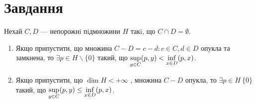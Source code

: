
\chapter{Завдання \theHchapter}


\begin{tcolorbox}[title=Завдання]
    Нехай $C, D$ — непорожнi пiдмножини $H$ такi, що 
    $C \cap D = \emptyset$. 
    \begin{enumerate}
        \item 
            Якщо припустити, що множина 
            $C - D = {c - d : c \in C, d \in D}$ 
            опукла та замкнена,
            то $ \exists p \in H \backslash \{0\}$ такий, що 
            $ \displaystyle\sup_{y \in C} (p, y) < \displaystyle\inf_{x \in D} (p, x)$.
        \item
            Якщо припустити, що $\dim H < +\infty$ , множина $C - D$
            опукла, то $\exists p \in H\ \{0\}$
            такий, що 
            $\displaystyle\sup_{y \in C} (p, y) \le \displaystyle\inf_{x \in D}(p, x)$.
    \end{enumerate}
    
\end{tcolorbox}



